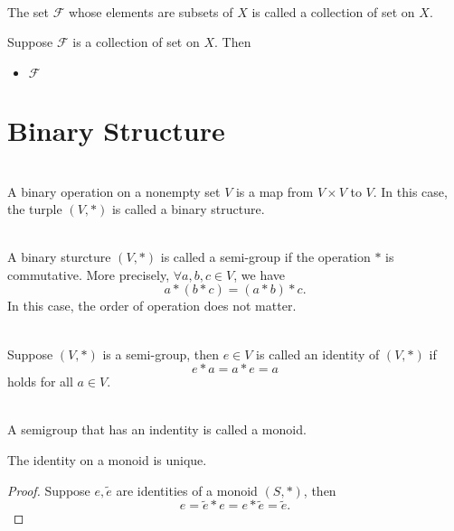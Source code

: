 \documentclass[12pt]{book}
\begin{document}
\begin{definition} \ \\
The set $\mathcal F$ whose elements are subsets of $X$ is called a collection of set on $X$.
\end{definition}

\begin{definition} Suppose $\mathcal F$ is a collection of set on $X$. Then 
	\begin{itemize}
		\item $\mathcal F$
	\end{itemize}
\end{definition}


\section{Binary Structure}
\begin{definition} \ \\
A binary operation on a nonempty set $V$ is a map from $V \times V$ to $V$. In this case, the turple $(V,*)$ is called a binary structure.

\end{definition}

\begin{definition} \ \\
A binary sturcture $(V,*)$ is called a semi-group if the operation $*$ is commutative. More precisely, $\forall a,b,c \in V$, we have
$$
a*(b*c) = (a*b)*c.
$$
In this case, the order of operation does not matter.
\end{definition}

\begin{definition}[Identity] \ \\
Suppose $(V,*)$ is a semi-group, then $e \in V$ is called an identity of $(V,*)$ if 
$$
e*a = a*e = a
$$
holds for all $a\in V$.
\end{definition}

\begin{definition}[Monoid] \ \\
A semigroup that has an indentity is called a monoid.
\end{definition}

\begin{theorem}
The identity on a monoid is unique.
\end{theorem}
\begin{proof}
Suppose $e,\tilde e$ are identities of a monoid $(S,*)$, then
$$
e = \tilde e *e = e*\tilde e= \tilde e.
$$	
\end{proof}
\end{document}
